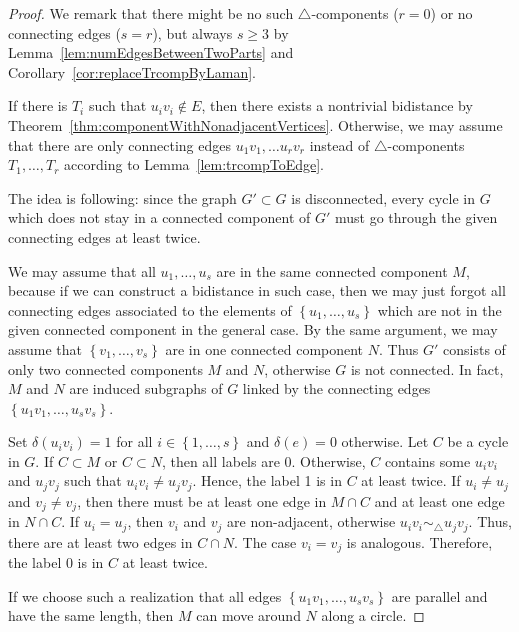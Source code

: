 \documentclass[a4paper, 11pt]{article}
\newcommand{\trcomps}{$\triangle$-components}
\theoremstyle{definition}
\begin{document}
\begin{proof}
We remark that there might be no such \trcomps{} ($r=0$) or no connecting edges ($s=r$), but always $s\geq 3$ by Lemma~\ref{lem:numEdgesBetweenTwoParts} and Corollary~\ref{cor:replaceTrcompByLaman}.

If there is $T_i$ such that $u_i v_i \notin E$, then there exists a nontrivial bidistance by Theorem~\ref{thm:componentWithNonadjacentVertices}.
Otherwise, we may assume that there are only connecting edges  $u_1 v_1, \dots u_r v_r$ instead of \trcomps{} $T_1, \dots, T_r$ according to Lemma~\ref{lem:trcompToEdge}.

The idea is following: since the graph $G'\subset G$ is disconnected, every cycle in $G$ which does not stay in a connected component of $G'$ must go through the given  connecting edges at least twice.

We may assume that all $u_1, \dots, u_s$ are in the same connected component $M$, because if we can construct a bidistance in such case, then we may just forgot all connecting edges associated to the elements of $\left\{u_1, \dots, u_s\right\}$ which are not in the given connected component in the general case. By the same argument, we may assume that $\left\{v_1, \dots, v_s\right\}$ are in one connected component $N$. Thus $G'$ consists of only two connected components $M$ and $N$, otherwise $G$ is not connected. In fact, $M$ and $N$ are induced subgraphs of $G$ linked by the connecting edges $\left\{u_1v_1, \dots, u_sv_s\right\}$.

Set $\delta(u_i v_i)=1$ for all $i\in \left\{1, \dots, s\right\}$ and $\delta(e)=0$ otherwise. Let $C$ be a cycle in $G$. If $C\subset M$ or  $C\subset N$, then all labels are 0. Otherwise, $C$ contains some $u_iv_i$ and $u_jv_j$ such that $u_iv_i\neq u_jv_j$. Hence, the label 1 is in $C$ at least twice. If $u_i\neq u_j$ and $v_j\neq v_j$, then there must be at least one edge in $M\cap C$ and at least one edge in $N\cap C$.  If $u_i=u_j$, then $v_i$ and $v_j$ are non-adjacent, otherwise $u_iv_i \sim_{\!\!\bigtriangleup} u_jv_j$. Thus, there are at least two edges in $C\cap N$. The case $v_i=v_j$ is analogous. Therefore, the label 0 is in $C$ at least twice.

If we choose such a realization that all edges $\left\{u_1v_1, \dots, u_sv_s\right\}$ are parallel and have the same length, then $M$ can move around $N$ along a circle.
\end{proof}
\end{document}
